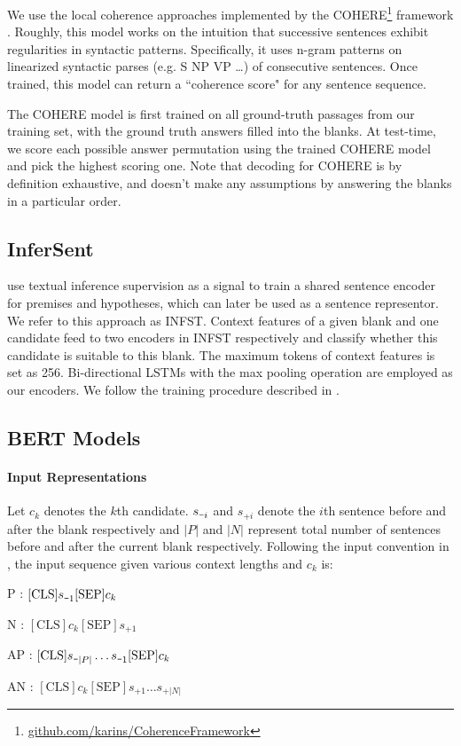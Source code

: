 \documentclass[11pt,a4paper]{article}
\newcommand{\minus}{\scalebox{0.55}[1.0]{$-$}}
\newenvironment{tight_enumerate}{
\begin{enumerate}
  \setlength{\itemsep}{0pt}
  \setlength{\parskip}{0pt}
}{\end{enumerate}}
\begin{document}
We use the local coherence approaches implemented by the \textsc{COHERE}\footnote{\url{github.com/karins/CoherenceFramework}} framework \cite{smith2016cohere}. Roughly, this model works on the intuition that successive sentences exhibit regularities in syntactic patterns. Specifically, it uses n-gram patterns on linearized syntactic parses (e.g. S NP VP \ldots) of consecutive sentences. Once trained, this model can return a ``coherence score" for any sentence sequence.


The \textsc{COHERE} model is first trained on all ground-truth passages from our training set, with the ground truth answers filled into the blanks. At test-time, we score each possible answer permutation using the trained \textsc{COHERE} model and pick the highest scoring one. Note that decoding for \textsc{COHERE} is by definition exhaustive, and doesn't make any assumptions by answering the blanks in a particular order.

\subsection{InferSent}
 use textual inference supervision as a signal to train a shared sentence encoder for premises and hypotheses, which can later be used as a sentence representor. We refer to this approach as \textsc{INFST}.
Context features of a given blank and one candidate feed to two encoders in \textsc{INFST} respectively and classify whether this candidate is suitable to this blank. The maximum tokens of context features is set as 256. Bi-directional LSTMs with the max pooling operation are employed as our encoders. We follow the training procedure described in .
\subsection{BERT Models}
\paragraph{Input Representations} \label{subsubsec:bertRepn}

Let $c_{k}$ denotes the $k$th candidate. $s_{\minus i}$ and $s_{+i}$ denote the $i$th sentence before and after the blank respectively and $|P|$ and $|N|$ represent total number of sentences before and after the current blank respectively. Following the input convention in , the input sequence given various context lengths and $c_{k}$ is:
\vspace{-\topsep}
\begin{tight_enumerate}
    \item \textsc{P} : $[\textrm{CLS}]s_{\minus1}[\textrm{SEP}]c_{k}$
    \item \textsc{N} : $[\textrm{CLS}]c_{k}[\textrm{SEP}]s_{+1}$
    \item \textsc{AP} : $[\textrm{CLS}]s_{\minus|P|}\ldots s_{\minus1}[\textrm{SEP}]c_{k}$
    \item \textsc{AN} : $[\textrm{CLS}]c_{k}[\textrm{SEP}]s_{+1}\ldots s_{+|N|}$
\end{tight_enumerate}
\end{document}
